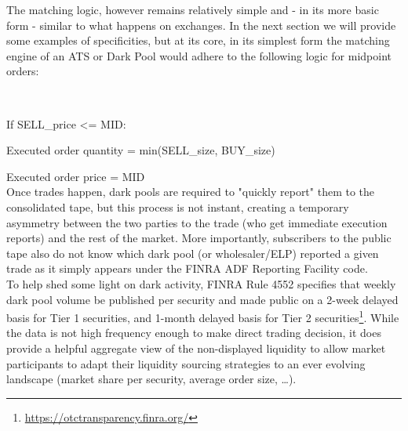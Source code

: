 The matching logic, however remains relatively simple and - in its more basic form - similar to what happens on exchanges. In the next section we will provide some examples of specificities, but at its core, in its simplest form the matching engine of an ATS or Dark Pool would adhere to the following logic for midpoint orders:\\




\\


 
If SELL_{price} <= MID:

      Executed order quantity = min(SELL_{size}, BUY_{size})


      Executed order price = MID\\

Once trades happen, dark pools are required to "quickly report" them to the consolidated tape, but this process is not instant, creating a temporary asymmetry between the two parties to the trade (who get immediate execution reports) and the rest of the market. More importantly, subscribers to the public tape also do not know which dark pool (or wholesaler/ELP) reported a given trade as it simply appears under the FINRA ADF Reporting Facility code.\\

To help shed some light on dark activity, FINRA Rule 4552 specifies that weekly dark pool volume be published per security and made public on a 2-week delayed basis for Tier 1 securities, and 1-month delayed basis for Tier 2 securities\footnote{\url{https://otctransparency.finra.org/}}. While the data is not high frequency enough to make direct trading decision, it does provide a helpful aggregate view of the non-displayed liquidity to allow market participants to adapt their liquidity sourcing strategies to an ever evolving landscape (market share per security, average order size, \dots).

